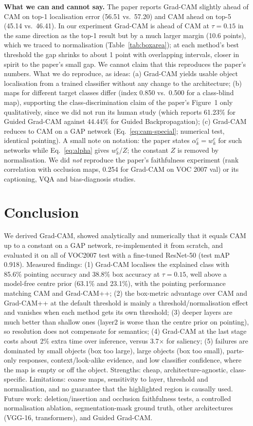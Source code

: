 \documentclass[11pt,a4paper]{article}
\newcommand{\GC}{Grad-CAM}
\begin{document}
\textbf{What we can and cannot say.} The paper reports \GC{} slightly ahead of CAM on top-1 localisation error (56.51 vs.\ 57.20) and CAM ahead on top-5 (45.14 vs.\ 46.41). In our experiment \GC{} is ahead of CAM at $\tau=0.15$ in the same direction as the top-1 result but by a much larger margin (10.6 points), which we traced to normalisation (Table~\ref{tab:boxarea}); at each method's best threshold the gap shrinks to about 1 point with overlapping intervals, closer in spirit to the paper's small gap. We cannot claim that this reproduces the paper's numbers. What we do reproduce, as ideas: (a) \GC{} yields usable object localisation from a trained classifier without any change to the architecture; (b) maps for different target classes differ (index 0.850 vs.\ 0.500 for a class-blind map), supporting the class-discrimination claim of the paper's Figure~1 only qualitatively, since we did not run its human study (which reports 61.23\% for Guided Grad-CAM against 44.44\% for Guided Backpropagation); (c) \GC{} reduces to CAM on a GAP network (Eq.~\eqref{eq:cam-special}; numerical test, identical pointing). A small note on notation: the paper states $\alpha^c_k=w^c_k$ for such networks while Eq.~\eqref{eq:alpha} gives $w^c_k/Z$; the constant $Z$ is removed by normalisation. We did \emph{not} reproduce the paper's faithfulness experiment (rank correlation with occlusion maps, 0.254 for \GC{} on VOC 2007 val) or its captioning, VQA and bias-diagnosis studies.

\section{Conclusion}
We derived \GC, showed analytically and numerically that it equals CAM up to a constant on a GAP network, re-implemented it from scratch, and evaluated it on all of VOC2007 test with a fine-tuned ResNet-50 (test mAP 0.918). Measured findings: (1) \GC{} localises the explained class with 85.6\% pointing accuracy and 38.8\% box accuracy at $\tau=0.15$, well above a model-free centre prior (63.1\% and 23.1\%), with the pointing performance matching CAM and Grad-CAM++; (2) the box-metric advantage over CAM and Grad-CAM++ at the default threshold is mainly a threshold/normalisation effect and vanishes when each method gets its own threshold; (3) deeper layers are much better than shallow ones (layer2 is worse than the centre prior on pointing), so resolution does not compensate for semantics; (4) \GC{} at the last stage costs about 2\% extra time over inference, versus 3.7$\times$ for saliency; (5) failures are dominated by small objects (box too large), large objects (box too small), parts-only responses, context/look-alike evidence, and low classifier confidence, where the map is empty or off the object. Strengths: cheap, architecture-agnostic, class-specific. Limitations: coarse maps, sensitivity to layer, threshold and normalisation, and no guarantee that the highlighted region is causally used. Future work: deletion/insertion and occlusion faithfulness tests, a controlled normalisation ablation, segmentation-mask ground truth, other architectures (VGG-16, transformers), and Guided Grad-CAM.



\end{document}
